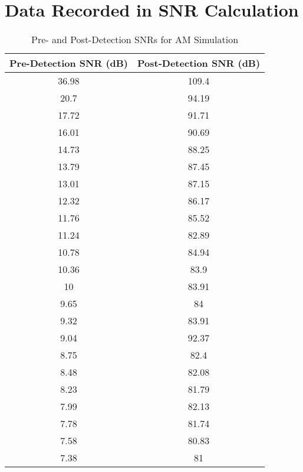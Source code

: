 \documentclass[../../ECE459FinalProjectReport.tex]{subfiles}
\begin{document}
\chapter{Data Recorded in SNR Calculation}

\begin{table}[H]
    \centering
    \caption{Pre- and Post-Detection SNRs for AM Simulation}
    \begin{tabular}{@{}cc@{}}
    \toprule
    Pre-Detection SNR   (dB) & Post-Detection SNR (dB) \\ \midrule
    36.98                    & 109.4                   \\
    20.7                     & 94.19                   \\
    17.72                    & 91.71                   \\
    16.01                    & 90.69                   \\
    14.73                    & 88.25                   \\
    13.79                    & 87.45                   \\
    13.01                    & 87.15                   \\
    12.32                    & 86.17                   \\
    11.76                    & 85.52                   \\
    11.24                    & 82.89                   \\
    10.78                    & 84.94                   \\
    10.36                    & 83.9                    \\
    10                       & 83.91                   \\
    9.65                     & 84                      \\
    9.32                     & 83.91                   \\
    9.04                     & 92.37                   \\
    8.75                     & 82.4                    \\
    8.48                     & 82.08                   \\
    8.23                     & 81.79                   \\
    7.99                     & 82.13                   \\
    7.78                     & 81.74                   \\
    7.58                     & 80.83                   \\
    7.38                     & 81                      \\ \bottomrule
    \end{tabular}
\end{table}
\end{document}
